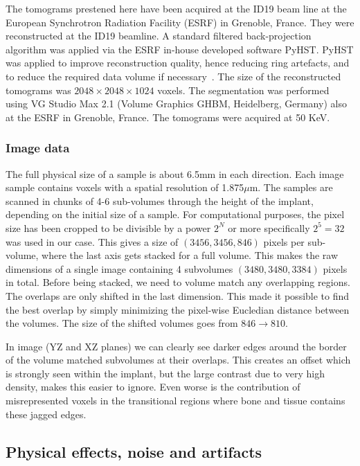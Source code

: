 The tomograms prestened here have been acquired at the ID19 beam line at the European Synchrotron
Radiation Facility (ESRF) in Grenoble, France. They were reconstructed\citep{sporring} at the
ID19 beamline. A standard filtered back-projection algorithm was applied via the ESRF in-house developed
software PyHST\citep{pyhst}. PyHST was applied to improve reconstruction quality, hence reducing ring
artefacts, and to reduce the required data volume if necessary~\cite{MIRONE201441}. The
size of the reconstructed tomograms was $2048 \times 2048 \times 1024$ voxels. The segmentation was
performed using VG Studio Max 2.1 (Volume Graphics GHBM, Heidelberg, Germany) also at the ESRF in
Grenoble, France. The tomograms were acquired at 50 KeV.

\subsubsection{Image data}

The full physical size of a sample is about 6.5mm in each direction. Each image sample contains
voxels with a spatial resolution of 1.875$\mu$m. The samples are scanned in chunks of 4-6
sub-volumes through the height of the implant, depending on the initial size of a sample.
For computational purposes, the pixel size has been cropped to be divisible by a power $2^N$ or
more specifically $2^5=32$ was used in our case. This gives a size of $(3456,3456,846)$ pixels
per sub-volume, where the last axis gets stacked for a full volume. This makes the raw dimensions
of a single image containing 4 subvolumes $(3480,3480,3384)$ pixels in total. Before being stacked,
we need to volume match any overlapping regions. The overlaps are only shifted in the last dimension.
This made it possible to find the best overlap by simply minimizing the pixel-wise Eucledian distance
between the volumes. The size of the shifted volumes goes from $846 \rightarrow 810$.

In image  (YZ and XZ planes) we can clearly see darker edges around the border
of the volume matched subvolumes at their overlaps. This creates an offset which is strongly seen
within the implant, but the large contrast due to very high density, makes this easier to ignore.
Even worse is the contribution of misrepresented voxels in the transitional regions where bone and
tissue contains these jagged edges.

\subsection{Physical effects, noise and artifacts}
\label{sec:physics}

